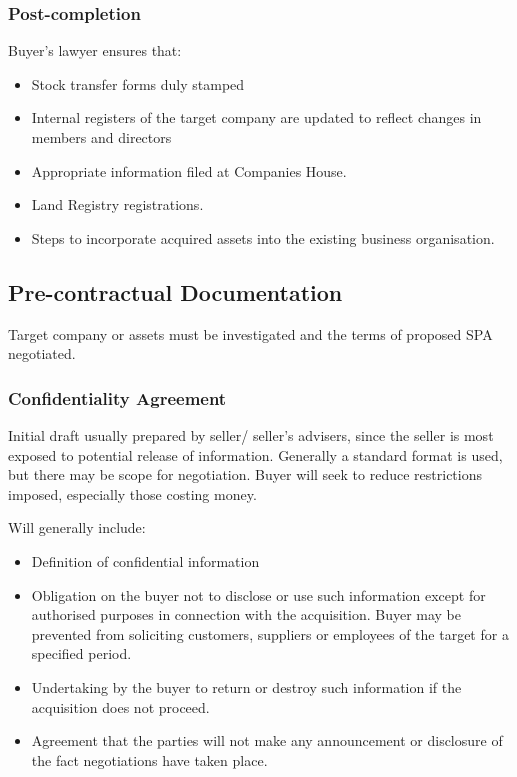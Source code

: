 \documentclass[
]{article}
\providecommand{\tightlist}{%
  \setlength{\itemsep}{0pt}\setlength{\parskip}{0pt}}
\begin{document}
\hypertarget{post-completion}{%
\subsubsection{Post-completion}\label{post-completion}}

Buyer's lawyer ensures that:

\begin{itemize}
\tightlist
\item
  Stock transfer forms duly stamped
\item
  Internal registers of the target company are updated to reflect
  changes in members and directors
\item
  Appropriate information filed at Companies House.
\item
  Land Registry registrations.
\item
  Steps to incorporate acquired assets into the existing business
  organisation.
\end{itemize}

\hypertarget{pre-contractual-documentation}{%
\subsection{Pre-contractual
Documentation}\label{pre-contractual-documentation}}

Target company or assets must be investigated and the terms of proposed
SPA negotiated.

\hypertarget{confidentiality-agreement-1}{%
\subsubsection{Confidentiality
Agreement}\label{confidentiality-agreement-1}}

Initial draft usually prepared by seller/ seller's advisers, since the
seller is most exposed to potential release of information. Generally a
standard format is used, but there may be scope for negotiation. Buyer
will seek to reduce restrictions imposed, especially those costing
money.

Will generally include:

\begin{itemize}
\tightlist
\item
  Definition of confidential information
\item
  Obligation on the buyer not to disclose or use such information except
  for authorised purposes in connection with the acquisition. Buyer may
  be prevented from soliciting customers, suppliers or employees of the
  target for a specified period.
\item
  Undertaking by the buyer to return or destroy such information if the
  acquisition does not proceed.
\item
  Agreement that the parties will not make any announcement or
  disclosure of the fact negotiations have taken place.
\end{itemize}
\end{document}
